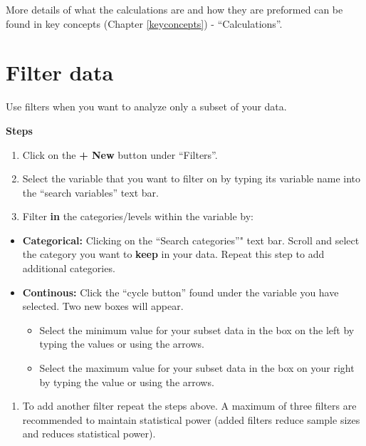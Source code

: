 \documentclass[]{book}
\providecommand{\tightlist}{%
  \setlength{\itemsep}{0pt}\setlength{\parskip}{0pt}}
\begin{document}
More details of what the calculations are and how they are preformed can
be found in key concepts (Chapter \ref{keyconcepts}) - ``Calculations''.

\section{Filter data}\label{filter-data}

Use filters when you want to analyze only a subset of your data.

\textbf{Steps}

\begin{enumerate}
\def\labelenumi{\arabic{enumi}.}
\item
  Click on the \textbf{+ New} button under ``Filters''.
\item
  Select the variable that you want to filter on by typing its variable
  name into the ``search variables'' text bar.
\item
  Filter \textbf{in} the categories/levels within the variable by:
\end{enumerate}

\begin{itemize}
\item
  \textbf{Categorical:} Clicking on the ``Search categories''" text bar.
  Scroll and select the category you want to \textbf{keep} in your data.
  Repeat this step to add additional categories.
\item
  \textbf{Continous:} Click the ``cycle button'' found under the
  variable you have selected. Two new boxes will appear.

  \begin{itemize}
  \tightlist
  \item
    Select the minimum value for your subset data in the box on the left
    by typing the values or using the arrows.
  \item
    Select the maximum value for your subset data in the box on your
    right by typing the value or using the arrows.
  \end{itemize}
\end{itemize}

\begin{enumerate}
\def\labelenumi{\arabic{enumi}.}
\setcounter{enumi}{3}
\tightlist
\item
  To add another filter repeat the steps above. A maximum of three
  filters are recommended to maintain statistical power (added filters
  reduce sample sizes and reduces statistical power).
\end{enumerate}
\end{document}
